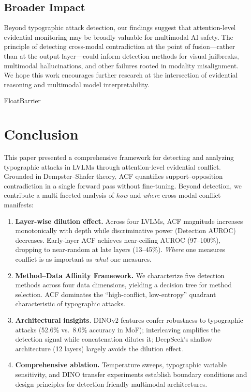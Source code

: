 \documentclass[preprint,12pt]{elsarticle}
\begin{document}
\subsection{Broader Impact}

Beyond typographic attack detection, our findings suggest that attention-level evidential monitoring may be broadly valuable for multimodal AI safety. The principle of detecting cross-modal contradiction at the point of fusion---rather than at the output layer---could inform detection methods for visual jailbreaks, multimodal hallucinations, and other failures rooted in modality misalignment. We hope this work encourages further research at the intersection of evidential reasoning and multimodal model interpretability.

FloatBarrier
\section{Conclusion}

This paper presented a comprehensive framework for detecting and analyzing typographic attacks in LVLMs through attention-level evidential conflict. Grounded in Dempster--Shafer theory, ACF quantifies support--opposition contradiction in a single forward pass without fine-tuning. Beyond detection, we contribute a multi-faceted analysis of \emph{how} and \emph{where} cross-modal conflict manifests:

\begin{enumerate}[leftmargin=*]
    \item \textbf{Layer-wise dilution effect.} Across four LVLMs, ACF magnitude increases monotonically with depth while discriminative power (Detection AUROC) decreases. Early-layer ACF achieves near-ceiling AUROC (97--100\%), dropping to near-random at late layers (13--45\%). \emph{Where} one measures conflict is as important as \emph{what} one measures.
    \item \textbf{Method--Data Affinity Framework.} We characterize five detection methods across four data dimensions, yielding a decision tree for method selection. ACF dominates the ``high-conflict, low-entropy'' quadrant characteristic of typographic attacks.
    \item \textbf{Architectural insights.} DINOv2 features confer robustness to typographic attacks (52.6\% vs.\ 8.0\% accuracy in MoF); interleaving amplifies the detection signal while concatenation dilutes it; DeepSeek's shallow architecture (12 layers) largely avoids the dilution effect.
    \item \textbf{Comprehensive ablation.} Temperature sweeps, typographic variable sensitivity, and DINO transfer experiments establish boundary conditions and design principles for detection-friendly multimodal architectures.
\end{enumerate}
\end{document}

